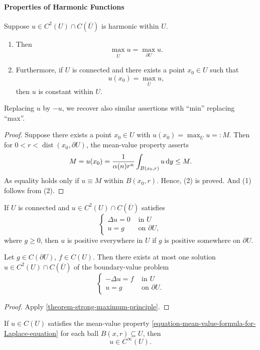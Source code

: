 \paragraph{Properties of Harmonic Functions}

\begin{theorem}
  \label{theorem-strong-maximum-principle}
  Suppose \( u \in C^2(U) \cap C(\overline{U}) \) is harmonic within \( U \).
  \begin{enumerate}
    \item Then
      \[
        \max_{\overline{U}} u = \max_{\partial U} u.
      \]
    \item Furthermore, if \( U \) is connected and there exists a point \( x_0 \in U \) such that
      \[
        u(x_0) = \max_{\overline{U}} u,
      \]
      then \( u \) is constant within \( U \).
  \end{enumerate}
  Replacing \( u \) by \( -u \), we recover also similar assertions with ``min'' replacing ``max''.
\end{theorem}
\begin{proof}
  Suppose there exists a point \( x_0 \in U \) with \( u(x_0) = \max_{\overline{U}} u =: M \).
  Then for \( 0 < r < \operatorname{dist}(x_0, \partial U) \), the mean-value property asserts
  \[
    M = u(x_0) = \frac{1}{\alpha(n)r^n} \int_{B(x_0, r)} u \mathop{}\!\mathrm{d} y \leq M.
  \]
  As equality holds only if \( u \equiv M \) within \( B(x_0, r) \).
  Hence, (2) is proved.
  And (1) follows from (2).
\end{proof}

\begin{corollary}
  \label{corollary-strong-maximum-principle}
  If \( U \) is connected and \( u \in C^2(U) \cap C(\overline{U}) \) satisfies
  \[
    \begin{cases}
    \Delta u = 0 & \text{ in } U\\
    u = g & \text{ on } \partial U,
    \end{cases}
  \]
  where \( g \geq 0 \), then \( u \) is positive everywhere in \( U \) if \( g \) is positive somewhere on \( \partial U \).
\end{corollary}

\begin{theorem}[Uniqueness]
  \label{theorem-uniqueness-Laplace-equation}
  Let \( g \in C(\partial U) \), \( f \in C(U) \).
  Then there exists at most one solution \( u \in C^2(U) \cap C(\overline{U}) \) of the boundary-value problem
  \[
    \begin{cases}
    - \Delta u = f & \text{ in } U\\
    u = g & \text{ on } \partial U.
    \end{cases}
  \]
\end{theorem}
\begin{proof}
  Apply \ref{theorem-strong-maximum-principle}.
\end{proof}

\begin{theorem}[Smoothness]
  \label{theorem-smoothness-Laplace-equation}
  If \( u \in C(U) \) satisfies the mean-value property \eqref{equation-mean-value-formula-for-Laplace-equation} for each ball \( B(x, r) \subseteq U \), then
  \[
    u \in C^{\infty}(U).
  \]
\end{theorem}


